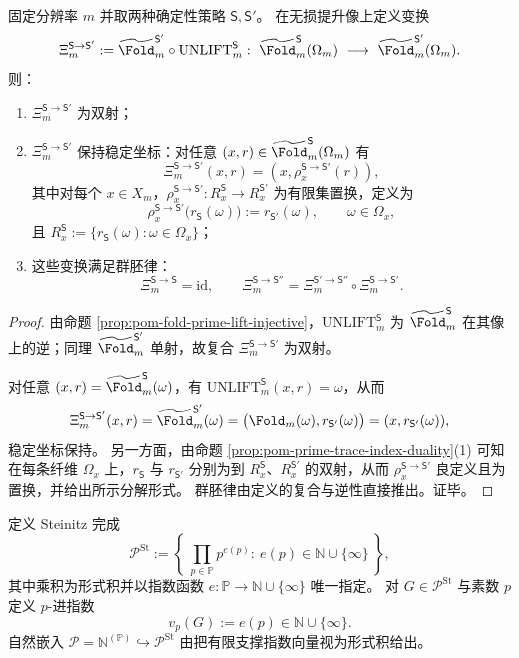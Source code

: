 \begin{proposition}\label{prop:pom-prime-register-strategy-gauge-groupoid}
固定分辨率 \(m\) 并取两种确定性策略 \(\mathsf S,\mathsf S'\)。
在无损提升像上定义变换
\[
\Xi_{m}^{\mathsf S\to\mathsf S'}
:=\widetilde{\Fold}^{\mathsf S'}_m\circ \mathrm{UNLIFT}^{\mathsf S}_m:
\ \widetilde{\Fold}^{\mathsf S}_m(\Omega_m)\ \longrightarrow\ \widetilde{\Fold}^{\mathsf S'}_m(\Omega_m).
\]
则：
\begin{enumerate}
  \item \(\Xi_{m}^{\mathsf S\to\mathsf S'}\) 为双射；
  \item \(\Xi_{m}^{\mathsf S\to\mathsf S'}\) 保持稳定坐标：对任意 \((x,r)\in \widetilde{\Fold}^{\mathsf S}_m(\Omega_m)\) 有
  \[
  \Xi_{m}^{\mathsf S\to\mathsf S'}(x,r)=(x,\rho_x^{\mathsf S\to\mathsf S'}(r)),
  \]
  其中对每个 \(x\in X_m\)，\(\rho_x^{\mathsf S\to\mathsf S'}:R_x^{\mathsf S}\to R_x^{\mathsf S'}\) 为有限集置换，定义为
  \[
  \rho_x^{\mathsf S\to\mathsf S'}\bigl(r_{\mathsf S}(\omega)\bigr):=r_{\mathsf S'}(\omega),
  \qquad \omega\in\Omega_x,
  \]
  且 \(R_x^{\mathsf S}:=\{r_{\mathsf S}(\omega):\omega\in\Omega_x\}\)；
  \item 这些变换满足群胚律：
  \[
  \Xi_{m}^{\mathsf S\to\mathsf S}=\mathrm{id},\qquad
  \Xi_{m}^{\mathsf S\to\mathsf S''}=\Xi_{m}^{\mathsf S'\to\mathsf S''}\circ \Xi_{m}^{\mathsf S\to\mathsf S'}.
  \]
\end{enumerate}
\end{proposition}
\begin{proof}
由命题 \ref{prop:pom-fold-prime-lift-injective}，\(\mathrm{UNLIFT}^{\mathsf S}_m\) 为 \(\widetilde{\Fold}^{\mathsf S}_m\) 在其像上的逆；同理 \(\widetilde{\Fold}^{\mathsf S'}_m\) 单射，故复合 \(\Xi_{m}^{\mathsf S\to\mathsf S'}\) 为双射。
\par
对任意 \((x,r)=\widetilde{\Fold}^{\mathsf S}_m(\omega)\)，有 \(\mathrm{UNLIFT}^{\mathsf S}_m(x,r)=\omega\)，从而
\[
\Xi_{m}^{\mathsf S\to\mathsf S'}(x,r)
=\widetilde{\Fold}^{\mathsf S'}_m(\omega)
=\bigl(\Fold_m(\omega),r_{\mathsf S'}(\omega)\bigr)
=(x,r_{\mathsf S'}(\omega)),
\]
稳定坐标保持。
另一方面，由命题 \ref{prop:pom-prime-trace-index-duality}(1) 可知在每条纤维 \(\Omega_x\) 上，\(r_{\mathsf S}\) 与 \(r_{\mathsf S'}\) 分别为到 \(R_x^{\mathsf S}\)、\(R_x^{\mathsf S'}\) 的双射，从而 \(\rho_x^{\mathsf S\to\mathsf S'}\) 良定义且为置换，并给出所示分解形式。
群胚律由定义的复合与逆性直接推出。证毕。
\end{proof}

\begin{definition}\label{def:pom-steinitz-prime-register}
定义 Steinitz 完成
\[
\mathcal{P}^{\mathrm{St}}
:=\left\{\ \prod_{p\in\mathbb{P}} p^{e(p)}:\ e(p)\in\mathbb{N}\cup\{\infty\}\ \right\},
\]
其中乘积为形式积并以指数函数 \(e:\mathbb{P}\to\mathbb{N}\cup\{\infty\}\) 唯一指定。
对 \(G\in\mathcal{P}^{\mathrm{St}}\) 与素数 \(p\) 定义 \(p\)-进指数
\[
v_p(G):=e(p)\in\mathbb{N}\cup\{\infty\}.
\]
自然嵌入 \(\mathcal{P}=\mathbb{N}^{(\mathbb{P})}\hookrightarrow \mathcal{P}^{\mathrm{St}}\) 由把有限支撑指数向量视为形式积给出。
\end{definition}

